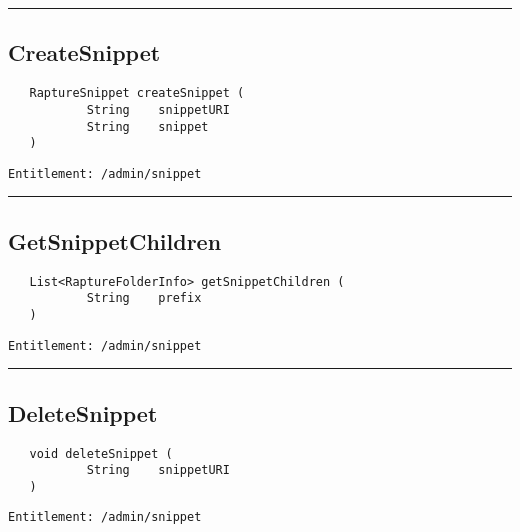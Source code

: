 \rule{12cm}{2pt}
\subsection{CreateSnippet}
\label{Api:CreateSnippet}
\begin{Verbatim}
   RaptureSnippet createSnippet (
           String    snippetURI
           String    snippet
   )
\end{Verbatim}
\begin{Verbatim}[formatcom=\color{Maroon}]
  Entitlement: /admin/snippet
\end{Verbatim}



\rule{12cm}{2pt}
\subsection{GetSnippetChildren}
\label{Api:GetSnippetChildren}
\begin{Verbatim}
   List<RaptureFolderInfo> getSnippetChildren (
           String    prefix
   )
\end{Verbatim}
\begin{Verbatim}[formatcom=\color{Maroon}]
  Entitlement: /admin/snippet
\end{Verbatim}



\rule{12cm}{2pt}
\subsection{DeleteSnippet}
\label{Api:DeleteSnippet}
\begin{Verbatim}
   void deleteSnippet (
           String    snippetURI
   )
\end{Verbatim}
\begin{Verbatim}[formatcom=\color{Maroon}]
  Entitlement: /admin/snippet
\end{Verbatim}



